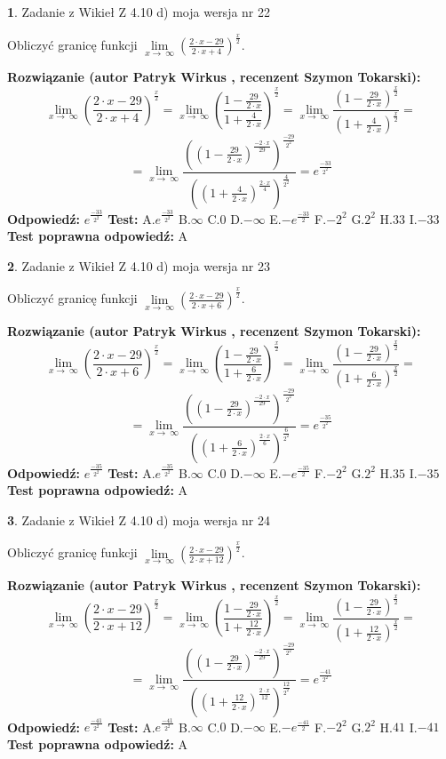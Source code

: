 \documentclass[12pt, a4paper]{article}
\theoremstyle{definition} %
\newtheorem{zad}{}
\newcommand{\zadStart}[1]{\begin{zad}#1\newline}
\newcommand{\zadStop}{\end{zad}}
\newcommand{\rozwStart}[2]{\noindent \textbf{Rozwiązanie (autor #1 , recenzent #2): }\newline}
\newcommand{\rozwStop}{\newline}
\newcommand{\odpStart}{\noindent \textbf{Odpowiedź:}\newline}
\newcommand{\odpStop}{\newline}
\newcommand{\testStart}{\noindent \textbf{Test:}\newline}
\newcommand{\testStop}{\newline}
\newcommand{\kluczStart}{\noindent \textbf{Test poprawna odpowiedź:}\newline}
\newcommand{\kluczStop}{\newline}
\begin{document}
\zadStart{Zadanie z Wikieł Z 4.10 d) moja wersja nr 22}


Obliczyć granicę funkcji  $\lim\limits_{x\to\ \infty}(\frac{2\cdot x-29}{2\cdot x+4})^{\frac{x}{2}}$.
\zadStop
\rozwStart{Patryk Wirkus}{Szymon Tokarski}
$$\lim\limits_{x\to\ \infty}(\frac{2\cdot x-29}{2\cdot x+4})^{\frac{x}{2}} = \lim\limits_{x\to\ \infty}(\frac{1-\frac{29}{2\cdot x}}{1+\frac{4}{2\cdot x}})^{\frac{x}{2}}=\lim\limits_{x\to\ \infty}\frac{(1-\frac{29}{2\cdot x})^{\frac{x}{2}}}{(1+\frac{4}{2\cdot x})^{\frac{x}{2}}}=$$
$$=\lim\limits_{x\to\ \infty}\frac{((1-\frac{29}{2\cdot x})^{\frac{-2\cdot x}{29}})^{\frac{-29}{2^{2}}}}{((1+\frac{4}{2\cdot x})^{\frac{2\cdot x}{4}})^{\frac{4}{2^{2}}}}=e^{\frac{-33}{2^{2}}}$$
\rozwStop
\odpStart
$e^{\frac{-33}{2^{2}}}$
\odpStop
\testStart
A.$e^{\frac{-33}{2^{2}}}$ B.$\infty$ C.$0$ D.$-\infty$ E.$-e^{\frac{-33}{2}}$
F.$-2^{2}$ G.$2^{2}$
H.$33$
I.$-33$
\testStop
\kluczStart
A
\kluczStop



\zadStart{Zadanie z Wikieł Z 4.10 d) moja wersja nr 23}


Obliczyć granicę funkcji  $\lim\limits_{x\to\ \infty}(\frac{2\cdot x-29}{2\cdot x+6})^{\frac{x}{2}}$.
\zadStop
\rozwStart{Patryk Wirkus}{Szymon Tokarski}
$$\lim\limits_{x\to\ \infty}(\frac{2\cdot x-29}{2\cdot x+6})^{\frac{x}{2}} = \lim\limits_{x\to\ \infty}(\frac{1-\frac{29}{2\cdot x}}{1+\frac{6}{2\cdot x}})^{\frac{x}{2}}=\lim\limits_{x\to\ \infty}\frac{(1-\frac{29}{2\cdot x})^{\frac{x}{2}}}{(1+\frac{6}{2\cdot x})^{\frac{x}{2}}}=$$
$$=\lim\limits_{x\to\ \infty}\frac{((1-\frac{29}{2\cdot x})^{\frac{-2\cdot x}{29}})^{\frac{-29}{2^{2}}}}{((1+\frac{6}{2\cdot x})^{\frac{2\cdot x}{6}})^{\frac{6}{2^{2}}}}=e^{\frac{-35}{2^{2}}}$$
\rozwStop
\odpStart
$e^{\frac{-35}{2^{2}}}$
\odpStop
\testStart
A.$e^{\frac{-35}{2^{2}}}$ B.$\infty$ C.$0$ D.$-\infty$ E.$-e^{\frac{-35}{2}}$
F.$-2^{2}$ G.$2^{2}$
H.$35$
I.$-35$
\testStop
\kluczStart
A
\kluczStop



\zadStart{Zadanie z Wikieł Z 4.10 d) moja wersja nr 24}


Obliczyć granicę funkcji  $\lim\limits_{x\to\ \infty}(\frac{2\cdot x-29}{2\cdot x+12})^{\frac{x}{2}}$.
\zadStop
\rozwStart{Patryk Wirkus}{Szymon Tokarski}
$$\lim\limits_{x\to\ \infty}(\frac{2\cdot x-29}{2\cdot x+12})^{\frac{x}{2}} = \lim\limits_{x\to\ \infty}(\frac{1-\frac{29}{2\cdot x}}{1+\frac{12}{2\cdot x}})^{\frac{x}{2}}=\lim\limits_{x\to\ \infty}\frac{(1-\frac{29}{2\cdot x})^{\frac{x}{2}}}{(1+\frac{12}{2\cdot x})^{\frac{x}{2}}}=$$
$$=\lim\limits_{x\to\ \infty}\frac{((1-\frac{29}{2\cdot x})^{\frac{-2\cdot x}{29}})^{\frac{-29}{2^{2}}}}{((1+\frac{12}{2\cdot x})^{\frac{2\cdot x}{12}})^{\frac{12}{2^{2}}}}=e^{\frac{-41}{2^{2}}}$$
\rozwStop
\odpStart
$e^{\frac{-41}{2^{2}}}$
\odpStop
\testStart
A.$e^{\frac{-41}{2^{2}}}$ B.$\infty$ C.$0$ D.$-\infty$ E.$-e^{\frac{-41}{2}}$
F.$-2^{2}$ G.$2^{2}$
H.$41$
I.$-41$
\testStop
\kluczStart
A
\kluczStop
\end{document}
